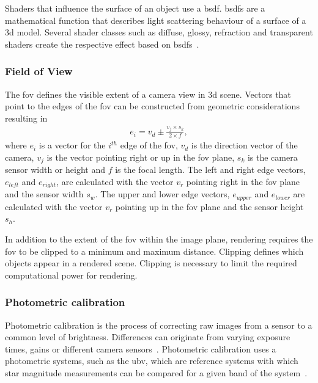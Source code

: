 Shaders that influence the surface of an object use a \gls{bsdf}. \glspl{bsdf} are a mathematical function that describes light scattering behaviour of a surface of a \gls{3d} model. Several shader classes such as diffuse, glossy, refraction and transparent shaders create the respective effect based on \glspl{bsdf}~\cite{FoundationCyclesIntroduction, Pharr2010ChapterMaterials}.

\subsubsection{Field of View}
The \gls{fov} defines the visible extent of a camera view in \gls{3d} scene. Vectors that point to the edges of the \gls{fov} can be constructed from geometric considerations resulting in
\begin{align}
    e_{i} = v_d \pm \frac{v_j \times s_k}{2 \times f}, \label{eq:fov_edge}
\end{align}
where $e_{i}$ is a vector for the $i^{th}$ edge of the \gls{fov}, $v_d$ is the direction vector of the camera, $v_j$ is the vector pointing right or up in the \gls{fov} plane, $s_k$ is the camera sensor width or height and $f$ is the focal length. The left and right edge vectors, $e_{left}$ and $e_{right}$, are calculated with the vector $v_r$ pointing right in the \gls{fov} plane and the sensor width $s_w$. The upper and lower edge vectors, $e_{upper}$ and $e_{lower}$  are calculated with the vector $v_r$ pointing up in the \gls{fov} plane and the sensor height $s_h$.

In addition to the extent of the \gls{fov} within the image plane, rendering requires the \gls{fov} to be clipped to a minimum and maximum distance. Clipping defines which objects appear in a rendered scene. Clipping is necessary to limit the required computational power for rendering. 

\subsubsection{Photometric calibration} \label{sec:photo_cal}
Photometric calibration is the process of correcting raw images from a sensor to a common level of brightness. Differences can originate from varying exposure times, gains or different camera sensors~\cite{Bergmann2018OnlineSLAM}. Photometric calibration uses a photometric systems, such as the \gls{ubv}, which are reference systems with which star magnitude measurements can be compared for a given band of the system~\cite{Bessell1979UBVRIPhotometry}.

